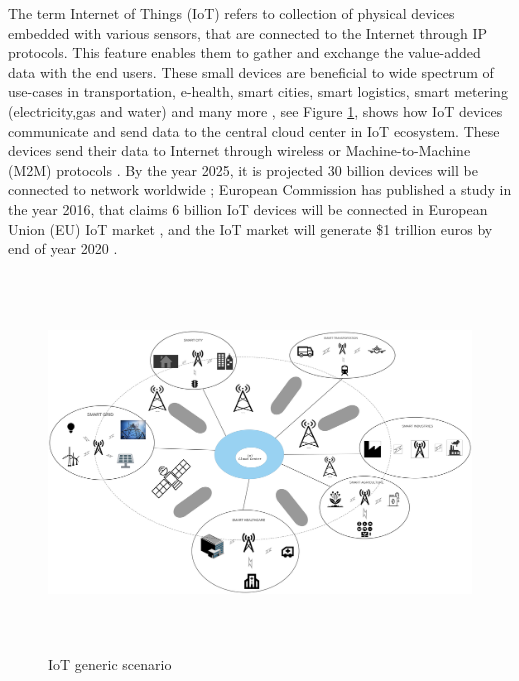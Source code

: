 \documentclass[12pt]{article}
\begin{document}
The term Internet of Things (IoT) refers to collection of physical devices embedded with various sensors, that are connected to the Internet through IP protocols. This feature enables them to gather and exchange the value-added data with the end users. These small devices are  beneficial to wide spectrum of use-cases in transportation, e-health, smart cities, smart logistics, smart metering (electricity,gas and water) and many more \cite{basu2019experimental}, see Figure \ref{fig:IoT generic scenario}, shows how IoT devices communicate and send data to the central cloud center in IoT ecosystem. These devices send their data to Internet through wireless or Machine-to-Machine (M2M) protocols \cite{singh2015secure}. By the year 2025, it is projected 30 billion devices will be connected to network worldwide \cite{nokiaresource}; European Commission has published a study in the year 2016, that claims 6 billion IoT devices will be connected in European Union (EU) IoT market \cite{EUIoT}, and the IoT market will generate \$1 trillion euros by end of year 2020 \cite{liu2019privacy}. \par
\begin{figure}[H]
  \includegraphics[width=\columnwidth,height=10cm,keepaspectratio]{Images/iot_generic_scenario.pdf}
  \centering
  \caption{IoT generic scenario}
  \label{fig:IoT generic scenario}
\end{figure}
\end{document}

